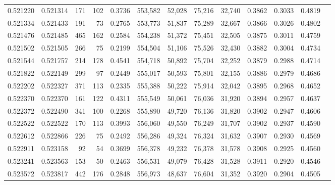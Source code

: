 \begin{tabular}{rrrrrrrrrrrrr}
0.521220 & 0.521314 &   171 &   102 &                                     0.3736 & 553,582 &  52,028 &  75,216 &  32,740 & 0.3862 & 0.3033 & 0.4819 \\
0.521334 & 0.521433 &   191 &    73 &                                     0.2765 & 553,773 &  51,837 &  75,289 &  32,667 & 0.3866 & 0.3026 & 0.4802 \\
0.521476 & 0.521485 &   465 &   162 &                                     0.2584 & 554,238 &  51,372 &  75,451 &  32,505 & 0.3875 & 0.3011 & 0.4759 \\
0.521502 & 0.521505 &   266 &    75 &                                     0.2199 & 554,504 &  51,106 &  75,526 &  32,430 & 0.3882 & 0.3004 & 0.4734 \\
0.521544 & 0.521757 &   214 &   178 &                                     0.4541 & 554,718 &  50,892 &  75,704 &  32,252 & 0.3879 & 0.2988 & 0.4714 \\
0.521822 & 0.522149 &   299 &    97 &                                     0.2449 & 555,017 &  50,593 &  75,801 &  32,155 & 0.3886 & 0.2979 & 0.4686 \\
0.522202 & 0.522327 &   371 &   113 &                                     0.2335 & 555,388 &  50,222 &  75,914 &  32,042 & 0.3895 & 0.2968 & 0.4652 \\
0.522370 & 0.522370 &   161 &   122 &                                     0.4311 & 555,549 &  50,061 &  76,036 &  31,920 & 0.3894 & 0.2957 & 0.4637 \\
0.522372 & 0.522490 &   341 &   100 &                                     0.2268 & 555,890 &  49,720 &  76,136 &  31,820 & 0.3902 & 0.2947 & 0.4606 \\
0.522522 & 0.522522 &   170 &   113 &                                     0.3993 & 556,060 &  49,550 &  76,249 &  31,707 & 0.3902 & 0.2937 & 0.4590 \\
0.522612 & 0.522866 &   226 &    75 &                                     0.2492 & 556,286 &  49,324 &  76,324 &  31,632 & 0.3907 & 0.2930 & 0.4569 \\
0.522911 & 0.523158 &    92 &    54 &                                     0.3699 & 556,378 &  49,232 &  76,378 &  31,578 & 0.3908 & 0.2925 & 0.4560 \\
0.523241 & 0.523563 &   153 &    50 &                                     0.2463 & 556,531 &  49,079 &  76,428 &  31,528 & 0.3911 & 0.2920 & 0.4546 \\
0.523572 & 0.523817 &   442 &   176 &                                     0.2848 & 556,973 &  48,637 &  76,604 &  31,352 & 0.3920 & 0.2904 & 0.4505 \\

\end{tabular}
